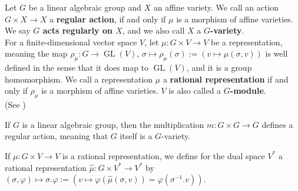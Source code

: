 \begin{definition}
  Let $G$ be a linear algebraic group and $X$ an affine variety.
  We call an action $G \times X \rightarrow X$ a \textbf{regular action}, if and only if $\mu$ is a morphism of affine varieties.
  We say \textbf{$ G $ acts regularly on $ X $}, and we also call $X$ a \textbf{$G$-variety}.\\
  For a finite-dimensional vector space $V$, let $\mu \colon G \times V \rightarrow V$ be a representation, meaning the map $\rho_\mu \colon G \rightarrow \operatorname{GL}(V)$, $\sigma \mapsto \rho_\mu(\sigma) := (v \mapsto \mu(\sigma,v))$ is well defined in the sense that it does map to $\operatorname{GL}(V)$, and it is a group homomorphism.
  We call a representation $\mu$ a \textbf{rational representation} if and only if $\rho_\mu$ is a morphism of affine varieties.
  $V$ is also called a \textbf{$G$-module}.\\
  (See \cite[p.~31]{DK15})
  
\end{definition}

\begin{dexample}
  If $G$ is a linear algebraic group, then the multiplication $m \colon G \times G \rightarrow G$ defines a regular action, meaning that $G$ itself is a $G$-variety.
\end{dexample}

\begin{definition}
  If $\mu \colon G \times V \rightarrow V$ is a rational representation, we define for the dual space $V^\ast$ a rational representation $\hat{\mu} \colon G \times V^\ast \rightarrow V^\ast$ by $(\sigma,\varphi) \mapsto \sigma.\varphi := (v \mapsto \varphi(\hat{\mu}(\sigma,v))= \varphi(\sigma^{-1}.v))$.
\end{definition}


